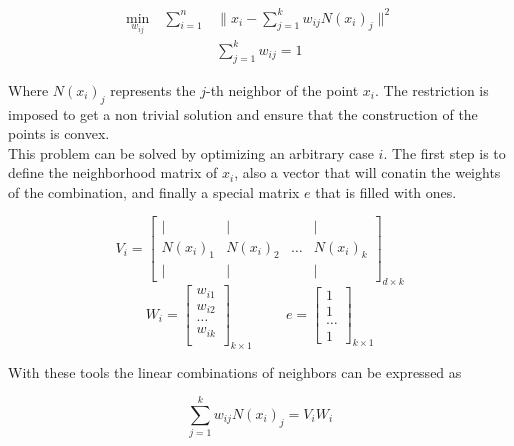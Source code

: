 \documentclass[12pt,journal]{IEEEtran}
\begin{document}
    \begin{equation*}
        \begin{aligned}
            \underset{w_{ij}}{\text{min}} \quad \sum_{i=1}^n & \lVert x_i - \sum_{j=1}^k w_{ij} N(x_i)_j \rVert^2 \\
            & \sum_{j=1}^k w_{ij} = 1
        \end{aligned}
    \end{equation*}

    Where $N(x_i)_j$ represents the $j$-th neighbor of the point $x_i$. The
    restriction is imposed to get a non trivial solution and ensure that
    the construction of the points is convex.\\

    This problem can be solved by optimizing an arbitrary case $i$. The first
    step is to define the neighborhood matrix of $x_i$, also a vector that will
    conatin the weights of the combination, and finally a special matrix $e$ that
    is filled with ones.

    \[
        V_i =
        \begin{bmatrix}
            |      &  |     &       & | \\
            N(x_i)_1 & N(x_i)_2 & \dots & N(x_i)_k \\
            |      &  |     &       & |
        \end{bmatrix}_{d \times k}
    \]
    \[
        W_i =
        \begin{bmatrix}
            w_{i1}\\
            w_{i2}\\
            \dots \\
            w_{ik}\\
        \end{bmatrix}_{k \times 1}
        \hspace{1cm}
        e =
        \begin{bmatrix}
        1\\
        1\\
        \dots\\
        1
        \end{bmatrix}_{k \times 1}
    \]

    With these tools the linear combinations of neighbors can be expressed as

    \begin{equation*}
        \sum_{j=1}^k w_{ij} N(x_i)_j = V_i W_i
    \end{equation*}
\end{document}
